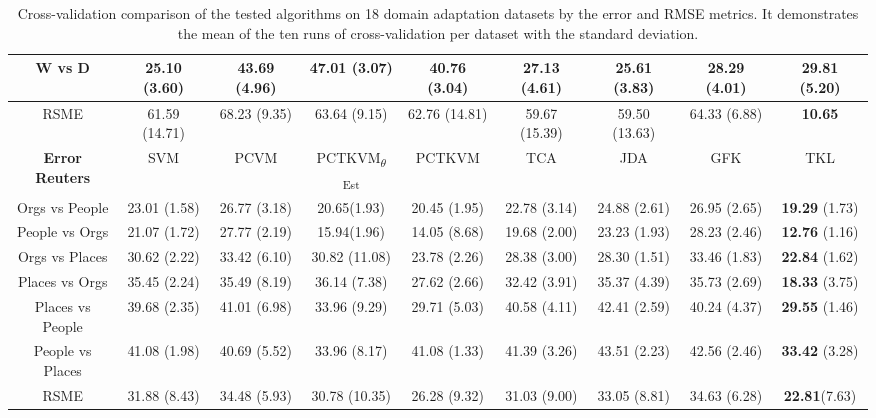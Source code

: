 \begin{table}[]
{\begin{tabular}{@{}ccccccccc@{}}
			W vs D                 & \textbf{25.10} (3.60)& 43.69 (4.96)& 47.01 (3.07)& 40.76  (3.04)& 27.13          (4.61)& 25.61 (3.83)& 28.29 (4.01)& 29.81   (5.20)       \\\midrule
			RSME                   & 61.59          (14.71)& 68.23 (9.35)& 63.64 (9.15)& 62.76  (14.81)& 59.67          (15.39)& 59.50 (13.63)& 64.33 (6.88)& \textbf{10.65} \\\midrule
			\textbf{Error Reuters} & SVM            & PCVM  & PCTKVM\textsubscript{$\theta$Est} & PCTKVM & TCA            & JDA   & GFK   & TKL            \\
			Orgs vs People         & 23.01          (1.58)& 26.77 (3.18)& 20.65(1.93)& 20.45  (1.95)& 22.78          (3.14)& 24.88 (2.61)& 26.95 (2.65)& \textbf{19.29} (1.73)\\
			People vs Orgs         & 21.07          (1.72)& 27.77 (2.19)& 15.94(1.96)& 14.05  (8.68)& 19.68          (2.00)& 23.23 (1.93)& 28.23 (2.46)& \textbf{12.76} (1.16)\\
			Orgs vs Places         & 30.62          (2.22)& 33.42 (6.10)& 30.82 (11.08)& 23.78  (2.26)& 28.38          (3.00)& 28.30 (1.51)& 33.46 (1.83)& \textbf{22.84} (1.62)\\
			Places vs Orgs         & 35.45          (2.24)& 35.49 (8.19)& 36.14 (7.38)& 27.62  (2.66)& 32.42          (3.91)& 35.37 (4.39)& 35.73 (2.69)& \textbf{18.33} (3.75)\\
			Places vs People       & 39.68          (2.35)& 41.01 (6.98)& 33.96 (9.29)& 29.71  (5.03)& 40.58          (4.11)& 42.41 (2.59)& 40.24 (4.37)& \textbf{29.55} (1.46)\\
			People vs Places       & 41.08          (1.98)& 40.69 (5.52)& 33.96 (8.17)& 41.08  (1.33)& 41.39          (3.26)& 43.51 (2.23)& 42.56 (2.46)& \textbf{33.42} (3.28)\\\midrule
			RSME                   & 31.88          (8.43)& 34.48 (5.93)&  30.78 (10.35)& 26.28  (9.32)& 31.03          (9.00)& 33.05 (8.81)& 34.63 (6.28)& \textbf{22.81}(7.63) \\ \bottomrule
	\end{tabular}}
	\caption[Complete Cross-Validtion Result of Error]{Cross-validation comparison of the tested algorithms on 18 domain adaptation datasets by the error and \acs{RMSE} metrics. It demonstrates the mean of the ten runs of cross-validation per dataset with the standard deviation.\label{BTableFTErr}}
\end{table}
